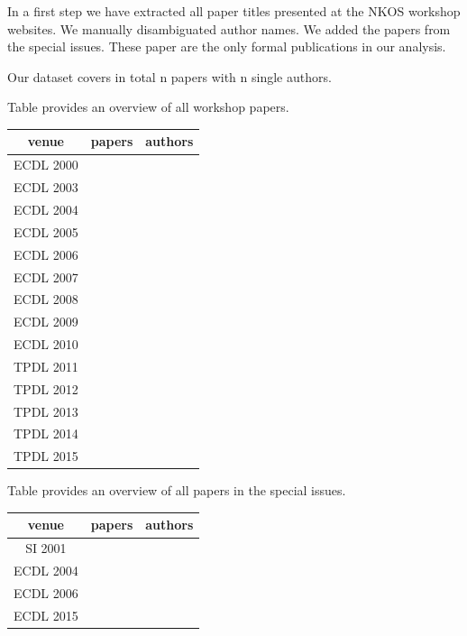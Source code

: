 \documentclass[runningheads,a4paper]{llncs}
\begin{document}
In a first step we have extracted all paper titles presented at the NKOS workshop websites. We manually disambiguated author names. We added the papers from the special issues. These paper are the only formal publications in our analysis.

Our dataset covers in total n %
papers with n %
single authors.

Table provides an overview of all workshop papers.


\begin{tabular}	{|c|c|c|}
	\hline 
	venue& papers  & authors  \\ 
	\hline 
	ECDL 2000&  &  \\ 
	\hline 
	ECDL 2003&  &  \\ 
	\hline 
	ECDL 2004&  &  \\ 
	\hline 
	ECDL 2005&  &  \\ 
	\hline 
	ECDL 2006&  &  \\ 
	\hline 
	ECDL 2007&  &  \\ 
	\hline 
	ECDL 2008&  &  \\ 
	\hline 
	ECDL 2009&  &  \\ 
	\hline 
	ECDL 2010&  &  \\ 
	\hline 
	TPDL 2011&  &  \\ 
	\hline 
	TPDL 2012&  &  \\ 
	\hline 
	TPDL 2013&  &  \\ 
	\hline 
	TPDL 2014&  &  \\ 
	\hline 
	TPDL 2015&  &  \\ 
	\hline 
\end{tabular} 


Table provides an overview of all papers in the special issues.

\begin{tabular}{|c|c|c|}
	\hline 
	venue& papers  & authors  \\ 
	\hline 
	SI 2001&  &  \\ 
	\hline 
	ECDL 2004&  &  \\ 
	\hline 
	ECDL 2006&  &  \\ 
	\hline 
	ECDL 2015&  &  \\ 
	\hline 
\end{tabular} 


\end{document}
